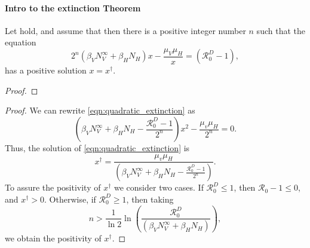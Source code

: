 \paragraph{Intro to the extinction Theorem}
\begin{lemma}
    \label{lem:quadratic_equation}
    Let  hold, 
    and assume that 
    then there is a positive integer number $n$
    such that the equation
    \begin{equation}\label{eqn:quadratic_extinction}
        2^n
        \left(
            \beta_V N_V^{\infty} +
            \beta_H N_H
        \right) x
        - \frac{\mu_V \mu_H}{x}
        =
        \left(
            \mathcal{R}_0^D -1
        \right),
    \end{equation}
    has a positive solution $x=x^\dagger$. 
\end{lemma}
\begin{proof}
\end{proof}
\begin{proof}
    We can rewrite \eqref{eqn:quadratic_extinction} as
    \begin{equation*}
        \left(
            \beta_V N_V ^ {\infty} +
            \beta_H N_H            
            -\frac{\mathcal{R}_0 ^ D - 1}{2 ^ n}
        \right) x ^ 2
        - \frac{\mu_v \mu_H}{2 ^ n}
        = 0.
    \end{equation*}
    Thus, the solution of \eqref{eqn:quadratic_extinction} is
    \begin{equation}
        \label{eqn:quadratic_solution}
        x^{\dagger} = 
            \frac{\mu_v \mu_H}{
                \left(
                    \beta_V N_V ^ {\infty} +
                    \beta_H N_H
                    -\frac{\mathcal{R}_0 ^ D - 1}{2 ^ n}
                \right)
            }.
    \end{equation}
    To assure the positivity of $x^{\dagger}$ we consider two cases.
    If $\mathcal{R}_0 ^ D \leq 1$, 
    then $\mathcal{R}_0 - 1 \leq 0$, and $x^{\dagger} >0$.
    Otherwise, if $\mathcal{R}_0 ^ D \geq 1$,
    then taking 
    \begin{equation}
        \label{eqn:n_condition}
        n > \frac{1}{\ln 2} 
            \ln
            \left(
                \displaystyle
                \frac{\mathcal{R}_0 ^ D}{
                    \left(
                        \beta_V N_V ^ {\infty} +
                        \beta_H N_H
                    \right)
                }    
            \right),
    \end{equation}
    we obtain the positivity of $x^{\dagger}$.
\end{proof}
